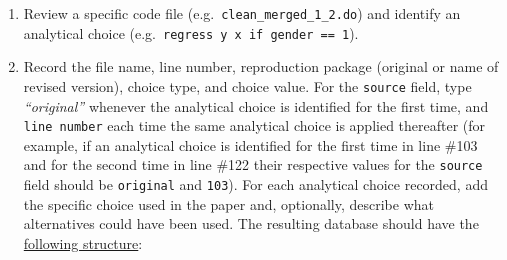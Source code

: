 \documentclass[
]{book}
\begin{document}
\begin{enumerate}
\def\labelenumi{\arabic{enumi}.}
\item
  Review a specific code file (e.g.~\texttt{clean\_merged\_1\_2.do}) and identify an analytical choice (e.g.~\texttt{regress\ y\ x\ if\ gender\ ==\ 1}).
\item
  Record the file name, line number, reproduction package (original or name of revised version), choice type, and choice value. For the \texttt{source} field, type \emph{``original''} whenever the analytical choice is identified for the first time, and \texttt{line\ number} each time the same analytical choice is applied thereafter (for example, if an analytical choice is identified for the first time in line \#103 and for the second time in line \#122 their respective values for the \texttt{source} field should be \texttt{original} and \texttt{103}). For each analytical choice recorded, add the specific choice used in the paper and, optionally, describe what alternatives could have been used. The resulting database should have the \href{https://docs.google.com/spreadsheets/d/1nZuJSHswbZgaaIfBcyIUGPwG-WIP8zE1Oambud-WoDc/edit?usp=sharing}{following structure}:
\end{enumerate}
\end{document}
